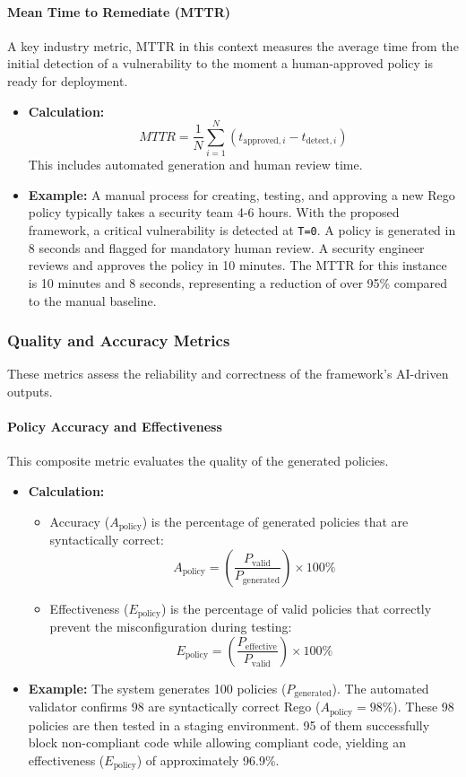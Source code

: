 \paragraph{Mean Time to Remediate (MTTR)} A key industry metric, MTTR in this context measures the average time from the initial detection of a vulnerability to the moment a human-approved policy is ready for deployment\cite{ref1}.
\begin{itemize}
    \item \textbf{Calculation:} \[ MTTR = \frac{1}{N} \sum_{i=1}^{N} (t_{\text{approved},i} - t_{\text{detect},i}) \] This includes automated generation and human review time.
    \item \textbf{Example:} A manual process for creating, testing, and approving a new Rego policy typically takes a security team 4-6 hours. With the proposed framework, a critical vulnerability is detected at \texttt{T=0}. A policy is generated in 8 seconds and flagged for mandatory human review. A security engineer reviews and approves the policy in 10 minutes. The MTTR for this instance is 10 minutes and 8 seconds, representing a reduction of over 95\% compared to the manual baseline.
\end{itemize}

\subsubsection*{Quality and Accuracy Metrics}
These metrics assess the reliability and correctness of the framework's AI-driven outputs.

\paragraph{Policy Accuracy and Effectiveness} This composite metric evaluates the quality of the generated policies.
\begin{itemize}
    \item \textbf{Calculation:}
        \begin{itemize}
            \item Accuracy (\( A_{\text{policy}} \)) is the percentage of generated policies that are syntactically correct:
            \[ A_{\text{policy}} = \left(\frac{P_{\text{valid}}}{P_{\text{generated}}}\right) \times 100\% \]
            \item Effectiveness (\( E_{\text{policy}} \)) is the percentage of valid policies that correctly prevent the misconfiguration during testing:
            \[ E_{\text{policy}} = \left(\frac{P_{\text{effective}}}{P_{\text{valid}}}\right) \times 100\% \]
        \end{itemize}
    \item \textbf{Example:} The system generates 100 policies (\( P_{\text{generated}} \)). The automated validator confirms 98 are syntactically correct Rego (\( A_{\text{policy}} = 98\% \)). These 98 policies are then tested in a staging environment. 95 of them successfully block non-compliant code while allowing compliant code, yielding an effectiveness (\( E_{\text{policy}} \)) of approximately 96.9\%.
\end{itemize}

